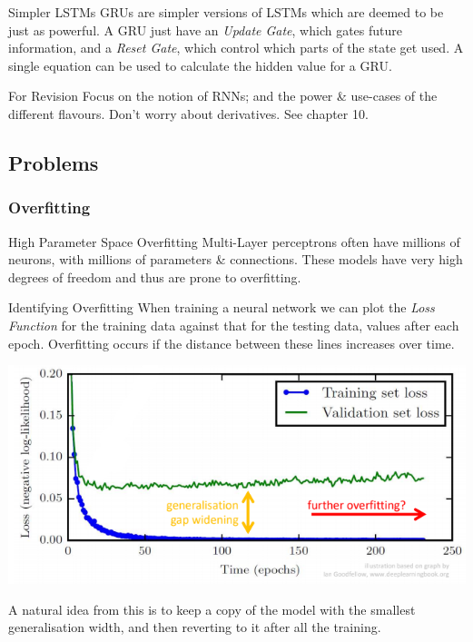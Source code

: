 \documentclass[11pt,a4paper]{article}
\begin{document}
  \begin{remark}{Simpler LSTMs}
    GRUs are simpler versions of LSTMs which are deemed to be just as powerful. A GRU just have an \textit{Update Gate}, which gates future information, and a \textit{Reset Gate}, which control which parts of the state get used. A single equation can be used to calculate the hidden value for a GRU.
  \end{remark}

  \begin{remark}{For Revision}
    Focus on the notion of RNNs; and the power \& use-cases of the different flavours. Don't worry about derivatives. See chapter 10.
  \end{remark}

\subsection{Problems}

\subsubsection{Overfitting}

  \begin{proposition}{High Parameter Space Overfitting}
    Multi-Layer perceptrons often have millions of neurons, with millions of parameters \& connections. These models have very high degrees of freedom and thus are prone to overfitting.
  \end{proposition}

  \begin{proposition}{Identifying Overfitting}
    When training a neural network we can plot the \textit{Loss Function} for the training data against that for the testing data, values after each epoch. Overfitting occurs if the distance between these lines increases over time.
    \begin{center}
      \includegraphics[width=.7\textwidth]{overfitting.PNG}
    \end{center}
    A natural idea from this is to keep a copy of the model with the smallest generalisation width, and then reverting to it after all the training.
  \end{proposition}
\end{document}
